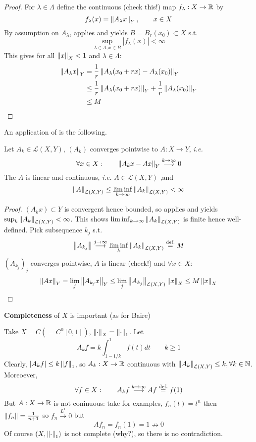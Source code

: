 \documentclass{article}
\begin{document}
\begin{proof}
For $\lambda \in \Lambda$ define the continuous (check this!) map $f_\lambda: X \to \mathbb{R}$ by  
$$
f_{\lambda}(x) = \left\|{A_{\lambda}x}\right\|_Y, \qquad x\in X
$$  
By assumption on $A_\lambda$,  applies and yields $B=B_r(x_0) \subset X$ s.t.  
$$
\sup_{\lambda \in \Lambda, x\in B} |f_{\lambda}(x)| < \infty
$$  
This gives for all $\left\|{x}\right\|_X<1$ and $\lambda \in \Lambda$:
\begin{align*}
    \left\|{A_\lambda x}\right\|_Y &= \frac{1}{r} \left\|{A_\lambda(x_0+rx)-A_\lambda(x_0)}\right\|_Y \\
    &\leq \frac{1}{r} \left\|{A_\lambda(x_0+rx)}\right\|_Y + \frac{1}{r} \left\|{A_\lambda(x_0)}\right\|_Y \\
    &\leq M
\end{align*}
\end{proof}  

An application of  is the following.  

\begin{proposition}
    Let $A_k \in \mathcal{L}(X,Y)$, $(A_k)$ converges pointwise to $A: X\to Y$, \textit{i.e.}  
    $$
    \forall x \in X: \qquad \left\|{A_k x - Ax}\right\|_Y \overset{k\to \infty}{\longrightarrow} 0 
    $$
    The $A$ is linear and continuous, \textit{i.e.} $A \in \mathcal{L}(X,Y)$ ,and  
    $$
    \left\|{A}\right\|_{\mathcal{L}(X,Y)} \leq \liminf_{k \to \infty} \left\|{A_k}\right\|_{\mathcal{L}(X,Y)} <\infty
    $$
\end{proposition}

\begin{proof}
    $(A_k x)\subset Y$ is convergent hence bounded, so  applies and yields $\sup_k \left\|{A_k}\right\|_{\mathcal{L}(X,Y)} < \infty$. This shows $\liminf_{k \to \infty} \left\|{A_k}\right\|_{\mathcal{L}(X,Y)}$ is finite hence well-defined. Pick subsequence $k_j$ s.t. 
    $$\left\|{A_{k_j}}\right\|\overset{j \to \infty}{\longrightarrow} \liminf_k \left\|{A_k}\right\|_{\mathcal{L}(X,Y)} \stackrel{\text{def.}}{=} M$$
    $(A_{k_j})_j$ converges pointwise, $A$ is linear (check!) and $\forall x \in X$:  
    $$
    \left\|{Ax}\right\|_Y = \lim_{j} \left\|{A_{k_j}x}\right\|_Y \leq \lim_j \left\|{A_{k_j}}\right\|_{\mathcal{L}(X,Y)} \left\|{x}\right\|_X \leq M \left\|{x}\right\|_X
    $$
\end{proof}

\begin{remark}
    \textbf{Completeness} of $X$ is important (as for Baire)  
    
    Take $X=C(=C^0[0,1])$, $\left\|{\cdot}\right\|_X=\left\|{\cdot}\right\|_1$. Let  
    $$
    A_k f = k\int_{1-1/k}^1 f(t) dt \qquad k\geq 1
    $$  
    Clearly, $|A_k f|\leq k \left\|{f}\right\|_1$, so $A_k: X\to \mathbb{R}$ continuous with $\left\|{A_k}\right\|_{\mathcal{L}(X,Y)} \leq k, \forall k \in \mathbb{N}$. Moreoever,  
    $$
    \forall f \in X: \qquad A_k f \overset{k\to \infty}{\longrightarrow} Af \stackrel{\text{def.}}{=} f(1)
    $$
    But $A:X\to \mathbb{R}$ is not coninuous: take for examples, $f_n(t)=t^n$ then $\left\|{f_n}\right\|=\frac{1}{n+1}$ so $f_n \overset{L^1}{\longrightarrow} 0 $ but  
    $$
    Af_n = f_n(1) = 1 \nrightarrow 0
    $$  
    Of course $(X, \left\|{\cdot}\right\|_1)$ is not complete (why?), so there is no contradiction.  
\end{remark}
\end{document}
